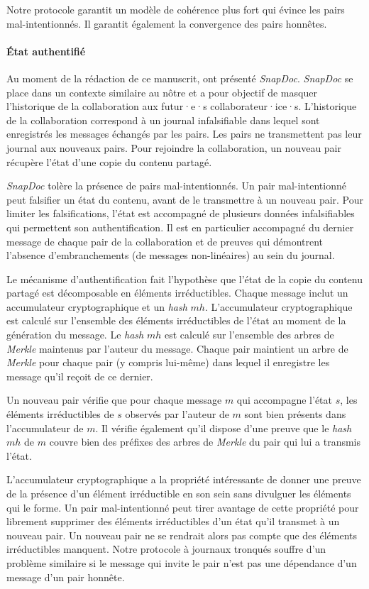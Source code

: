 Notre protocole garantit un modèle de cohérence plus fort qui évince les pairs mal-intentionnés.
Il garantit également la convergence des pairs honnêtes.


\paragraph{État authentifié} Au moment de la rédaction de ce manuscrit, \textcite{kollmann2019_snapdoc} ont présenté \emph{SnapDoc}.
\emph{SnapDoc} se place dans un contexte similaire au nôtre et a pour objectif de masquer l'historique de la collaboration aux futur·e·s collaborateur·ice·s.
L'historique de la collaboration correspond à un journal infalsifiable dans lequel sont enregistrés les messages échangés par les pairs.
Les pairs ne transmettent pas leur journal aux nouveaux pairs.
Pour rejoindre la collaboration, un nouveau pair récupère l'état d'une copie du contenu partagé.

\emph{SnapDoc} tolère la présence de pairs mal-intentionnés.
Un pair mal-intentionné peut falsifier un état du contenu, avant de le transmettre à un nouveau pair.
Pour limiter les falsifications, l'état est accompagné de plusieurs données infalsifiables qui permettent son authentification.
Il est en particulier accompagné du dernier message de chaque pair de la collaboration et de preuves qui démontrent l'absence d'embranchements (de messages non-linéaires) au sein du journal.

Le mécanisme d'authentification fait l'hypothèse que l'état de la copie du contenu partagé est décomposable en éléments irréductibles.
Chaque message inclut un accumulateur cryptographique et un \emph{hash} $mh$.
L'accumulateur cryptographique est calculé sur l'ensemble des éléments irréductibles de l'état au moment de la génération du message.
Le \emph{hash} $mh$ est calculé sur l'ensemble des arbres de \emph{Merkle} maintenus par l'auteur du message.
Chaque pair maintient un arbre de \emph{Merkle} pour chaque pair (y compris lui-même) dans lequel il enregistre les message qu'il reçoit de ce dernier.

Un nouveau pair vérifie que pour chaque message $m$ qui accompagne l'état $s$, les éléments irréductibles de $s$ observés par l'auteur de $m$ sont bien présents dans l'accumulateur de $m$.
Il vérifie également qu'il dispose d'une preuve que le \emph{hash} $mh$ de $m$ couvre bien des préfixes des arbres de \emph{Merkle} du pair qui lui a transmis l'état.



L'accumulateur cryptographique a la propriété intéressante de donner une preuve de la présence d'un élément irréductible en son sein sans divulguer les éléments qui le forme.
Un pair mal-intentionné peut tirer avantage de cette propriété pour librement supprimer des éléments irréductibles d'un état qu'il transmet à un nouveau pair.
Un nouveau pair ne se rendrait alors pas compte que des éléments irréductibles manquent.
Notre protocole à journaux tronqués souffre d'un problème similaire si le message qui invite le pair n'est pas une dépendance d'un message d'un pair honnête.



